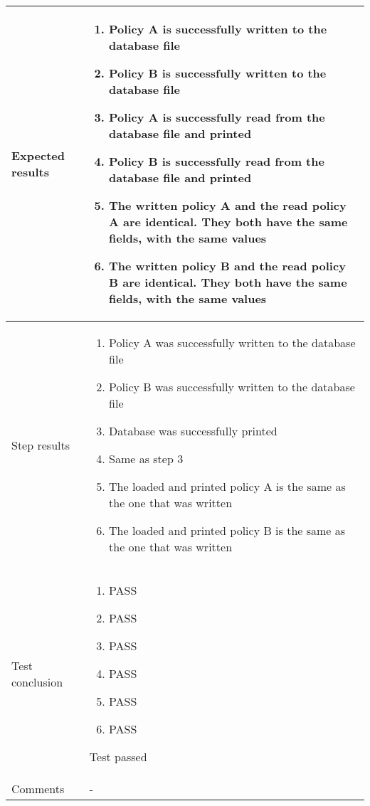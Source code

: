 \documentclass[a4paper]{article}
\begin{document}
\begin{center}
\begin{tabular}{ |  p{3cm} | p{7cm} | }
			Expected results &	\begin{enumerate}
							\item Policy A is successfully written to the database file
							\item Policy B is successfully written to the database file
							\item Policy A is successfully read from the database file and printed
							\item Policy B is successfully read from the database file and printed
							\item The written policy A and the read policy A are identical. They both have the same fields, with the same values
							\item The written policy B and the read policy B are identical. They both have the same fields, with the same values
						\end{enumerate}
							 \\  [5pt] \hline

			Step results & 	\begin{enumerate}
							\item Policy A was successfully written to the database file
							\item Policy B was successfully written to the database file
							\item Database was successfully printed
							\item Same as step 3
							\item The loaded and printed policy A is the same as the one that was written
							\item The loaded and printed policy B is the same as the one that was written
						\end{enumerate}
							 \\  [5pt] \hline

			Test conclusion & 	\begin{enumerate}
							\item PASS
							\item PASS
							\item PASS
							\item PASS
							\item PASS
							\item PASS
						\end{enumerate}
						Test passed \\  [5pt] \hline
			Comments &	- \\ [5pt] \hline
		\end{tabular}
	\end{center}
\end{document}
